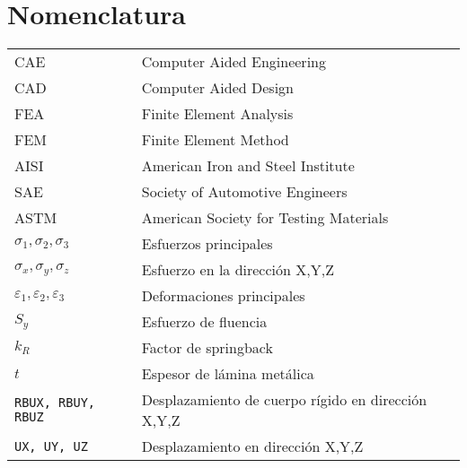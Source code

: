 \chapter*{Nomenclatura}




\begin{table}[h]
\def\arraystretch{1.15}
\begin{tabular}{p{4cm} p{12cm}}

CAE      &                       		      Computer Aided Engineering \\
CAD &                                  		  Computer Aided Design \\
FEA &                                  		  Finite Element Analysis \\
FEM & 							              Finite Element Method \\
AISI &                                        American Iron and Steel Institute \\
SAE &                                         Society of Automotive Engineers \\
ASTM &                                        American Society for Testing Materials \\
$\sigma_1, \sigma_2, \sigma_3$ &              Esfuerzos principales \\
$\sigma_x, \sigma_y, \sigma_z$ &			  Esfuerzo en la dirección X,Y,Z \\
$\varepsilon_1, \varepsilon_2, \varepsilon_3$ & Deformaciones principales \\
$ S_y $ &                                     Esfuerzo de fluencia \\
$ k_R $ &                                     Factor de springback \\
$ t $ &                                       Espesor de lámina metálica \\
{\tt RBUX, RBUY, RBUZ} &                      Desplazamiento de cuerpo rígido en dirección X,Y,Z \\
{\tt UX, UY, UZ} &                            Desplazamiento en dirección X,Y,Z \\



\end{tabular}
\end{table}